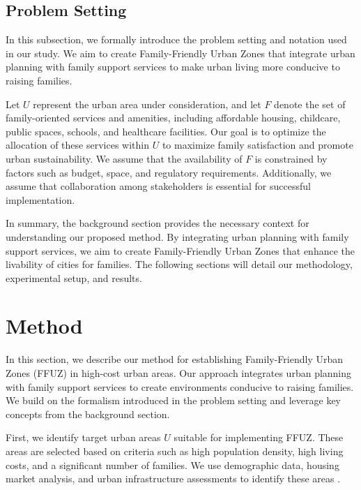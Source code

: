 \documentclass{article} %
\begin{document}
\subsection{Problem Setting}
\label{sec:problem_setting}

In this subsection, we formally introduce the problem setting and notation used in our study. We aim to create Family-Friendly Urban Zones that integrate urban planning with family support services to make urban living more conducive to raising families.

Let \( U \) represent the urban area under consideration, and let \( F \) denote the set of family-oriented services and amenities, including affordable housing, childcare, public spaces, schools, and healthcare facilities. Our goal is to optimize the allocation of these services within \( U \) to maximize family satisfaction and promote urban sustainability. We assume that the availability of \( F \) is constrained by factors such as budget, space, and regulatory requirements. Additionally, we assume that collaboration among stakeholders is essential for successful implementation.

In summary, the background section provides the necessary context for understanding our proposed method. By integrating urban planning with family support services, we aim to create Family-Friendly Urban Zones that enhance the livability of cities for families. The following sections will detail our methodology, experimental setup, and results.

\section{Method}
\label{sec:method}

In this section, we describe our method for establishing Family-Friendly Urban Zones (FFUZ) in high-cost urban areas. Our approach integrates urban planning with family support services to create environments conducive to raising families. We build on the formalism introduced in the problem setting and leverage key concepts from the background section.

First, we identify target urban areas \( U \) suitable for implementing FFUZ. These areas are selected based on criteria such as high population density, high living costs, and a significant number of families. We use demographic data, housing market analysis, and urban infrastructure assessments to identify these areas \citep{park2023generative}.
\end{document}
